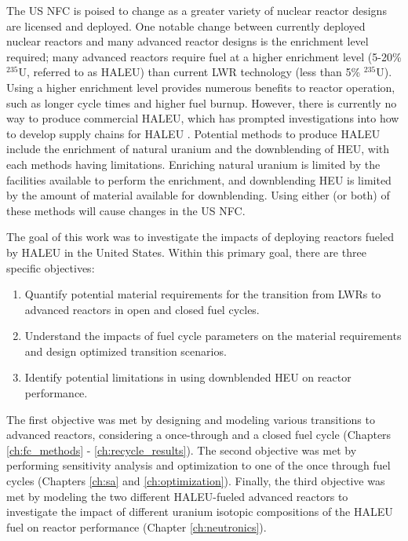 The US \acrfull{NFC} is poised to change as a greater variety of 
nuclear reactor designs are licensed and deployed. One notable change 
between currently deployed nuclear reactors and many advanced 
reactor designs is the enrichment level required; many advanced 
reactors require fuel at a higher enrichment level (5-20\% $^{235}$U, 
referred to as \acrfull{HALEU}) than current \acrfull{LWR} technology 
(less than 5\% $^{235}$U). Using a higher enrichment level provides 
numerous benefits to reactor operation, such as longer cycle 
times and higher fuel burnup. However, there is currently no way 
to produce commercial \gls{HALEU}, which has prompted investigations 
into how to develop supply chains for \gls{HALEU}
\cite{regalbuto_addressing_2020,dixon_estimated_2022}. Potential 
methods to produce \gls{HALEU} include the enrichment of natural 
uranium and the downblending of \acrfull{HEU}, with each 
methods having limitations. Enriching natural 
uranium is limited by the facilities available to perform 
the enrichment, and downblending \gls{HEU} is limited by the 
amount of material available for downblending. Using either (or 
both) of these methods will cause changes in the US \gls{NFC}. 


The goal of this work was to investigate the impacts of deploying reactors 
fueled by \gls{HALEU} in the United States. Within this primary goal, 
there are three specific objectives:
\vspace{0.2cm} 
\noindent
\begin{enumerate}
\item Quantify potential material requirements for the transition 
from \glspl{LWR} to advanced reactors in open and closed 
fuel cycles.

\item Understand the impacts of fuel cycle parameters on the material 
requirements and design optimized transition scenarios.


\item Identify potential limitations in using downblended \gls{HEU} 
on reactor performance.
\end{enumerate}

\noindent The first objective was met by designing and modeling various 
transitions 
to advanced reactors, considering a once-through and a closed 
fuel cycle (Chapters \ref{ch:fc_methods} - \ref{ch:recycle_results}). 
The second objective was met by performing sensitivity 
analysis and optimization to one of the once through fuel cycles
(Chapters \ref{ch:sa} and \ref{ch:optimization}). 
Finally, the third objective was met by modeling the two different 
\gls{HALEU}-fueled advanced reactors to investigate the impact of 
different uranium isotopic 
compositions of the \gls{HALEU} fuel on reactor performance (Chapter 
\ref{ch:neutronics}). 

